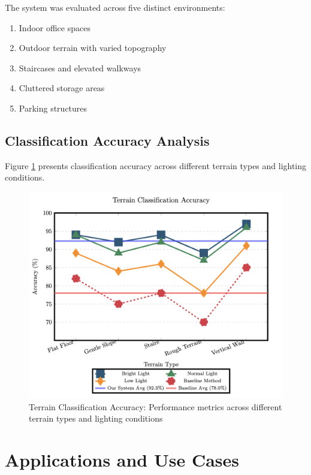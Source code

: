 \documentclass[conference]{IEEEtran}
\begin{document}
The system was evaluated across five distinct environments:
\begin{enumerate}
    \item Indoor office spaces
    \item Outdoor terrain with varied topography
    \item Staircases and elevated walkways
    \item Cluttered storage areas
    \item Parking structures
\end{enumerate}

\subsection{Classification Accuracy Analysis}

Figure \ref{fig:accuracy} presents classification accuracy across different terrain types and lighting conditions.

\begin{figure}[H]
    \centering
    \includegraphics[width=\columnwidth]{accuracy.png}
    \caption{Terrain Classification Accuracy: Performance metrics across different terrain types and lighting conditions}
    \label{fig:accuracy}
    \end{figure}

\section{Applications and Use Cases}
\end{document}
